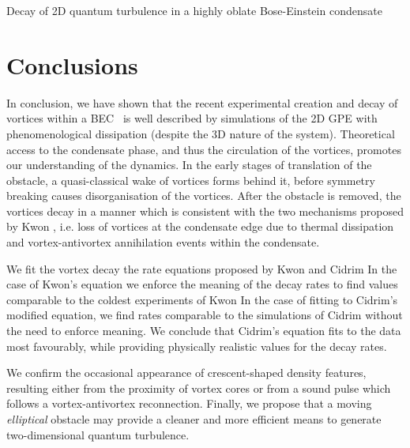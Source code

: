 \begin{chapter}{\label{cha:shin}Decay of 2D quantum turbulence in a highly oblate Bose-Einstein condensate}
\section{Conclusions}
In conclusion, we have shown that the recent experimental creation and decay of vortices within a BEC~\citep{kwon_moon_14} is well described by simulations of the 2D GPE with phenomenological dissipation (despite the 3D nature of the system).  Theoretical access to the condensate phase, and thus the circulation of the vortices, promotes our understanding of the dynamics.  In the early stages of 
translation of the obstacle, a quasi-classical wake of vortices 
forms behind it, before symmetry breaking causes disorganisation 
of the vortices.  After the obstacle is removed, 
the vortices decay in a manner which is consistent with the two mechanisms proposed by 
Kwon \etalcc, i.e. loss of vortices at the condensate edge due to thermal dissipation and vortex-antivortex 
annihilation events within the condensate.

We fit the vortex decay the rate equations proposed by Kwon \etal and Cidrim \etal In the case of Kwon's equation we enforce the meaning of the decay rates to find values comparable to the coldest experiments of Kwon \etal In the case of fitting to Cidrim's modified equation, we find rates comparable to the simulations of Cidrim \etal without the need to enforce meaning. We conclude that Cidrim's equation fits to the data most favourably, while providing physically realistic values for the decay rates.

We confirm the occasional appearance of crescent-shaped density features, resulting either from the proximity 
of vortex cores or from a sound pulse which follows a vortex-antivortex reconnection.  Finally, we propose that a moving {\it elliptical} obstacle may provide a cleaner and more efficient means to generate two-dimensional quantum turbulence.

\end{chapter}